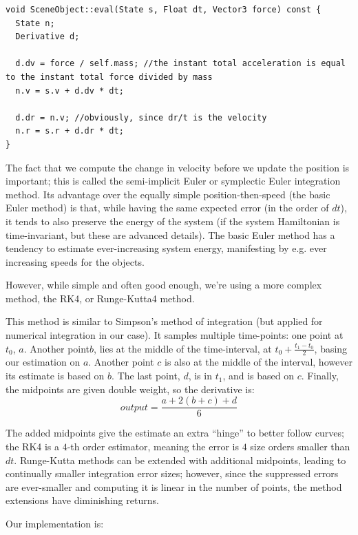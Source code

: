 \documentclass{scrartcl}
\begin{document}
\begin{lstlisting}
void SceneObject::eval(State s, Float dt, Vector3 force) const {
  State n;
  Derivative d;
  
  d.dv = force / self.mass; //the instant total acceleration is equal to the instant total force divided by mass
  n.v = s.v + d.dv * dt;
  
  d.dr = n.v; //obviously, since dr/t is the velocity
  n.r = s.r + d.dr * dt;
}
\end{lstlisting}

The fact that we compute the change in velocity before we update the position is important; this is called the semi-implicit Euler or symplectic Euler integration method. Its advantage over the equally simple position-then-speed (the basic Euler method) is that, while having the same expected error (in the order of $dt$), it tends to also preserve the energy of the system (if the system Hamiltonian is time-invariant, but these are advanced details). The basic Euler method has a tendency to estimate ever-increasing system energy, manifesting by e.g. ever increasing speeds for the objects.

However, while simple and often good enough, we're using a more complex method, the RK4, or Runge-Kutta4 method.

This method is similar to Simpson's method of integration (but applied for numerical integration in our case). It samples multiple time-points: one point at $t_0$, $a$. Another point$b$, lies at the middle of the time-interval, at $t_0 + \frac{t_1 - t_0}{2}$, basing our estimation on $a$. Another point $c$ is also at the middle of the interval, however its estimate is based on $b$. The last point, $d$, is in $t_1$, and is based on $c$. Finally, the midpoints are given double weight, so the derivative is:
$$output = \frac{a + 2(b + c) + d}{6}$$

The added midpoints give the estimate an extra ``hinge'' to better follow curves; the RK4 is a $4$-th order estimator, meaning the error is $4$ size orders smaller than $dt$. Runge-Kutta methods can be extended with additional midpoints, leading to continually smaller integration error sizes; however, since the suppressed errors are ever-smaller and computing it is linear in the number of points, the method extensions have diminishing returns.

Our implementation is:
\end{document}

